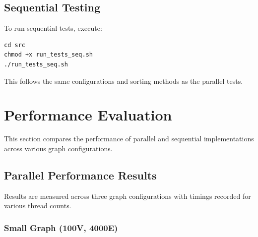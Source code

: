 \documentclass[11pt]{article}
\begin{document}
\subsection{Sequential Testing}
To run sequential tests, execute:
\begin{lstlisting}
cd src
chmod +x run_tests_seq.sh
./run_tests_seq.sh
\end{lstlisting}
This follows the same configurations and sorting methods as the parallel tests.

\section{Performance Evaluation}
This section compares the performance of parallel and sequential implementations across various graph configurations.

\subsection{Parallel Performance Results}
Results are measured across three graph configurations with timings recorded for various thread counts.

\subsubsection*{Small Graph (100V, 4000E)}
\begin{table}[H]
    \centering
    \caption{Parallel performance for Small Graph (100V, 4000E). Speedup is computed as the (time with 1 thread)/(best time across threads).}
    \label{tab:small_parallel}
\end{table}
\end{document}
